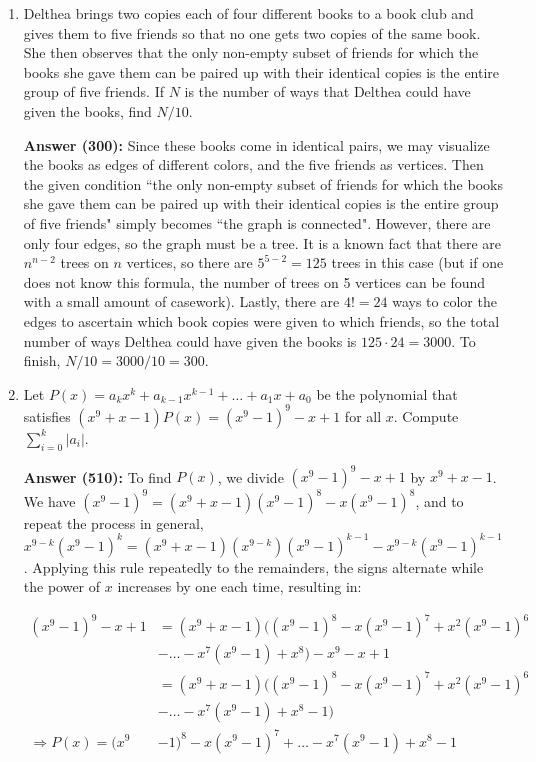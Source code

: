 \documentclass{article}
\begin{document}
\begin{enumerate}
\item Delthea brings two copies each of four different books to a book club and gives them to five friends so that no one gets two copies of the same book. She then observes that the only non-empty subset of friends for which the books she gave them can be paired up with their identical copies is the entire group of five friends. If $N$ is the number of ways that Delthea could have given the books, find $N/10$.

\newpage

\textbf{Answer (300):} Since these books come in identical pairs, we may visualize the books as edges of different colors, and the five friends as vertices. Then the given condition ``the only non-empty subset of friends for which the books she gave them can be paired up with their identical copies is the entire group of five friends" simply becomes ``the graph is connected". However, there are only four edges, so the graph must be a tree. It is a known fact that there are $n^{n-2}$ trees on $n$ vertices, so there are $5^{5-2} = 125$ trees in this case (but if one does not know this formula, the number of trees on 5 vertices can be found with a small amount of casework). Lastly, there are $4!=24$ ways to color the edges to ascertain which book copies were given to which friends, so the total number of ways Delthea could have given the books is $125 \cdot 24 = 3000$. To finish, $N/10 = 3000/10 = \boxed{300}$.

\item Let $P(x) = a_kx^k + a_{k-1}x^{k-1} + \ldots + a_1x + a_0$ be the polynomial that satisfies $(x^9+x-1)P(x) = (x^9-1)^9-x+1$ for all $x$. Compute $\displaystyle \sum_{i=0}^k |a_i|$.

\textbf{Answer (510):} To find $P(x)$, we divide $(x^9-1)^9-x+1$ by $x^9+x-1$. We have $(x^9-1)^9 = (x^9+x-1)(x^9-1)^8 - x(x^9-1)^8$, and to repeat the process in general, $x^{9-k}(x^9-1)^k = (x^9+x-1)(x^{9-k})(x^9-1)^{k-1} - x^{9-k}(x^9-1)^{k-1}$. Applying this rule repeatedly to the remainders, the signs alternate while the power of $x$ increases by one each time, resulting in: 

\begin{align*}
    (x^9-1)^9-x+1 &= (x^9+x-1)((x^9-1)^8-x(x^9-1)^7+x^2(x^9-1)^6 \\
    &-\ldots-x^7(x^9-1)+x^8) - x^9 - x+1 \\
    &= (x^9+x-1)((x^9-1)^8-x(x^9-1)^7+x^2(x^9-1)^6 \\
    &-\ldots-x^7(x^9-1)+x^8-1) \\
    \Rightarrow P(x) = (x^9&-1)^8-x(x^9-1)^7+\ldots-x^7(x^9-1)+x^8-1
\end{align*}


\end{enumerate}
\end{document}
